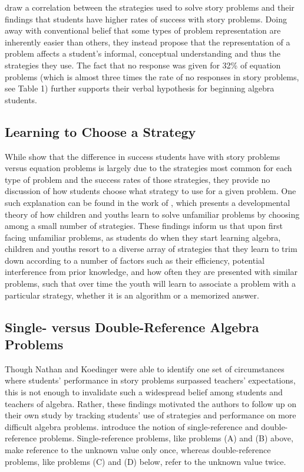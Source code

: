 \documentclass[10pt,letterpaper]{article}
\begin{document}
	 draw a correlation between the strategies used to solve story problems and their findings that students have higher rates of success with story problems. Doing away with conventional belief that some types of problem representation are inherently easier than others, they instead propose that the representation of a problem affects a student's informal, conceptual understanding and thus the strategies they use. The fact that no response was given for 32\% of equation problems (which is almost three times the rate of no responses in story problems, see Table 1) %
	further supports their verbal hypothesis for beginning algebra students.
	
	\subsection{Learning to Choose a Strategy}
	
	While  show that the difference in success students have with story problems versus equation problems is largely due to the strategies most common for each type of problem and the success rates of those strategies, they provide no discussion of how students choose what strategy to use for a given problem. One such explanation can be found in the work of , which presents a developmental theory of how children and youths learn to solve unfamiliar problems by choosing among a small number of strategies. These findings inform us that upon first facing unfamiliar problems, as students do when they start learning algebra, children and youths resort to a diverse array of strategies that they learn to trim down according to a number of factors such as their efficiency, potential interference from prior knowledge, and how often they are presented with similar problems, such that over time the youth will learn to associate a problem with a particular strategy, whether it is an algorithm or a memorized answer.
	
	\subsection{Single- versus Double-Reference Algebra Problems}
	
	Though Nathan and Koedinger were able to identify one set of circumstances where students' performance in story problems surpassed teachers' expectations, this is not enough to invalidate such a widespread belief among students and teachers of algebra. Rather, these findings motivated the authors to follow up on their own study by tracking students' use of strategies and performance on more difficult algebra problems.  introduce the notion of single-reference and double-reference problems. Single-reference problems, like problems (A) and (B) above, make reference to the unknown value only once, whereas double-reference problems, like problems (C) and (D) below, refer to the unknown value twice.
	
\end{document}
